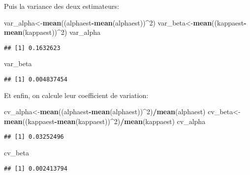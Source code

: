 \documentclass[
]{article}
\newenvironment{Shaded}{\begin{snugshade}}{\end{snugshade}}
\newcommand{\DecValTok}[1]{\textcolor[rgb]{0.00,0.00,0.81}{#1}}
\newcommand{\KeywordTok}[1]{\textcolor[rgb]{0.13,0.29,0.53}{\textbf{#1}}}
\newcommand{\NormalTok}[1]{#1}
\newcommand{\OperatorTok}[1]{\textcolor[rgb]{0.81,0.36,0.00}{\textbf{#1}}}
\begin{document}
Puis la variance des deux estimateurs:

\begin{Shaded}
\begin{Highlighting}[]
\NormalTok{var_alpha<-}\KeywordTok{mean}\NormalTok{((alphaest}\OperatorTok{-}\KeywordTok{mean}\NormalTok{(alphaest))}\OperatorTok{^}\DecValTok{2}\NormalTok{)}
\NormalTok{var_beta<-}\KeywordTok{mean}\NormalTok{((kappaest}\OperatorTok{-}\KeywordTok{mean}\NormalTok{(kappaest))}\OperatorTok{^}\DecValTok{2}\NormalTok{)}
\NormalTok{var_alpha}
\end{Highlighting}
\end{Shaded}

\begin{verbatim}
## [1] 0.1632623
\end{verbatim}

\begin{Shaded}
\begin{Highlighting}[]
\NormalTok{var_beta}
\end{Highlighting}
\end{Shaded}

\begin{verbatim}
## [1] 0.004837454
\end{verbatim}

Et enfin, on calcule leur coefficient de variation:

\begin{Shaded}
\begin{Highlighting}[]
\NormalTok{cv_alpha<-}\KeywordTok{mean}\NormalTok{((alphaest}\OperatorTok{-}\KeywordTok{mean}\NormalTok{(alphaest))}\OperatorTok{^}\DecValTok{2}\NormalTok{)}\OperatorTok{/}\KeywordTok{mean}\NormalTok{(alphaest)}
\NormalTok{cv_beta<-}\KeywordTok{mean}\NormalTok{((kappaest}\OperatorTok{-}\KeywordTok{mean}\NormalTok{(kappaest))}\OperatorTok{^}\DecValTok{2}\NormalTok{)}\OperatorTok{/}\KeywordTok{mean}\NormalTok{(kappaest)}
\NormalTok{cv_alpha}
\end{Highlighting}
\end{Shaded}

\begin{verbatim}
## [1] 0.03252496
\end{verbatim}

\begin{Shaded}
\begin{Highlighting}[]
\NormalTok{cv_beta}
\end{Highlighting}
\end{Shaded}

\begin{verbatim}
## [1] 0.002413794
\end{verbatim}
\end{document}
